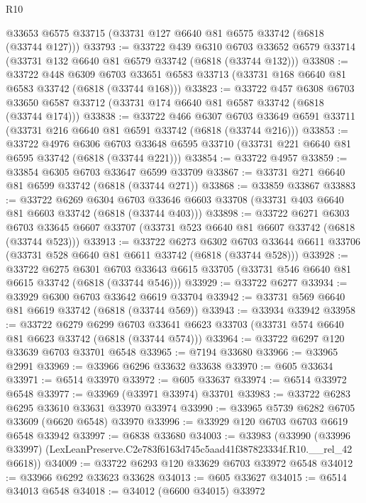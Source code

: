 \begin{lexlean}{R10}
\begin{coremodule}
    @33653
    @6575
    @33715
    (@33731 @127 @6640 @81 @6575 @33742 (@6818 (@33744 @127)))
@33793 := @33722
    @439
    @6310
    @6703
    @33652
    @6579
    @33714
    (@33731 @132 @6640 @81 @6579 @33742 (@6818 (@33744 @132)))
@33808 := @33722
    @448
    @6309
    @6703
    @33651
    @6583
    @33713
    (@33731 @168 @6640 @81 @6583 @33742 (@6818 (@33744 @168)))
@33823 := @33722
    @457
    @6308
    @6703
    @33650
    @6587
    @33712
    (@33731 @174 @6640 @81 @6587 @33742 (@6818 (@33744 @174)))
@33838 := @33722
    @466
    @6307
    @6703
    @33649
    @6591
    @33711
    (@33731 @216 @6640 @81 @6591 @33742 (@6818 (@33744 @216)))
@33853 := @33722
    @4976
    @6306
    @6703
    @33648
    @6595
    @33710
    (@33731 @221 @6640 @81 @6595 @33742 (@6818 (@33744 @221)))
@33854 := @33722 @4957
@33859 := @33854 @6305 @6703 @33647 @6599 @33709
@33867 := @33731 @271 @6640 @81 @6599 @33742 (@6818 (@33744 @271))
@33868 := @33859 @33867
@33883 := @33722
    @6269
    @6304
    @6703
    @33646
    @6603
    @33708
    (@33731 @403 @6640 @81 @6603 @33742 (@6818 (@33744 @403)))
@33898 := @33722
    @6271
    @6303
    @6703
    @33645
    @6607
    @33707
    (@33731 @523 @6640 @81 @6607 @33742 (@6818 (@33744 @523)))
@33913 := @33722
    @6273
    @6302
    @6703
    @33644
    @6611
    @33706
    (@33731 @528 @6640 @81 @6611 @33742 (@6818 (@33744 @528)))
@33928 := @33722
    @6275
    @6301
    @6703
    @33643
    @6615
    @33705
    (@33731 @546 @6640 @81 @6615 @33742 (@6818 (@33744 @546)))
@33929 := @33722 @6277
@33934 := @33929 @6300 @6703 @33642 @6619 @33704
@33942 := @33731 @569 @6640 @81 @6619 @33742 (@6818 (@33744 @569))
@33943 := @33934 @33942
@33958 := @33722
    @6279
    @6299
    @6703
    @33641
    @6623
    @33703
    (@33731 @574 @6640 @81 @6623 @33742 (@6818 (@33744 @574)))
@33964 := @33722 @6297 @120 @33639 @6703 @33701 @6548
@33965 := @7194 @33680
@33966 := @33965 @2991
@33969 := @33966 @6296 @33632 @33638
@33970 := @605 @33634
@33971 := @6514 @33970
@33972 := @605 @33637
@33974 := @6514 @33972 @6548
@33977 := @33969 (@33971 @33974) @33701
@33983 := @33722 @6283 @6295 @33610 @33631 @33970 @33974
@33990 := @33965 @5739 @6282 @6705 @33609 (@6620 @6548) @33970
@33996 := @33929 @120 @6703 @6703 @6619 @6548 @33942
@33997 := @6838 @33680
@34003 := @33983
    (@33990 (@33996 @33997) (LexLeanPreserve.C2e783f6163d745c5aad41f387823334f.R10.__rel_42 @6618))
@34009 := @33722 @6293 @120 @33629 @6703 @33972 @6548
@34012 := @33966 @6292 @33623 @33628
@34013 := @605 @33627
@34015 := @6514 @34013 @6548
@34018 := @34012 (@6600 @34015) @33972

\end{coremodule}
\end{lexlean}
